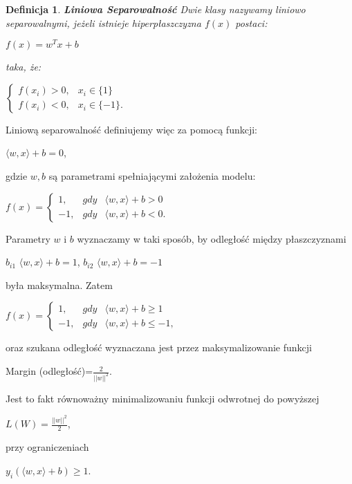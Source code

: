 \documentclass[12pt,a4paper]{report}
\newtheorem{df}{Definicja}[chapter]
\begin{document}
\begin{df}\textbf{Liniowa Separowalność}%
Dwie klasy nazywamy liniowo separowalnymi, jeżeli istnieje hiperpłaszczyzna $f(x)$ postaci:
\begin{center}
$f(x) = w^T x +b$
\end{center}
taka, że:
\begin{center}
$\left\{\begin{array}{ll}
f(x_i)>0, &    x_i\in\{1\} \\
f(x_i)<0, &    x_i\in\{-1\}.
\end{array} \right.$
\end{center}
\end{df}
\bigskip
\bigskip
\bigskip
Liniową separowalność definiujemy więc za pomocą funkcji:
\begin{center}
$\langle w,x \rangle + b = 0$, 
\end{center}
gdzie $w, b$ są parametrami spełniającymi założenia modelu:
\begin{center}
$f(x) = 
\left\{\begin{array}{lll}
1, & gdy &   \langle w,x \rangle + b > 0 \\
-1, &   gdy &   \langle w,x \rangle + b < 0.
\end{array} \right.$
\end{center}
Parametry $w$ i $b$ wyznaczamy w taki sposób, by odległość między płaszczyznami
\begin{center}
$ b_{i1}$ $\langle w,x \rangle + b = 1$,
$ b_{i2}$ $\langle w,x \rangle + b = -1$
\end{center}
była maksymalna.
Zatem
\begin{center}
$f(x) = 
\left\{\begin{array}{lll}
1, & gdy &   \langle w,x \rangle + b \geq 1 \\
-1, &   gdy &   \langle w,x \rangle + b \leq -1,
\end{array} \right.$
\end{center}
oraz szukana odległość wyznaczana jest przez maksymalizowanie funkcji 
\begin{center}
Margin (odległość)=$\frac{2}{||w||^2}$.
\end{center}
Jest to fakt równoważny minimalizowaniu funkcji odwrotnej do powyższej
\begin{center}
$L(W) = \frac{||w||^2}{2}$,
\end{center}
przy ograniczeniach
\begin{center}
$y_i(\langle w,x \rangle + b) \geq 1$.
\end{center}
\end{document}
